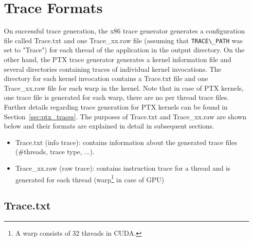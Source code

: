 \section{Trace Formats}
\label{sec:traceformat}

 On successful trace
      generation, the x86 trace generator generates a configuration file called
      Trace.txt and one Trace\_xx.raw file (assuming that \Verb+TRACE\_PATH+
          was set to "Trace") for each thread of the application in the output
      directory. On the other hand, the PTX trace generator generates a kernel
      information file and several directories containing traces of individual
      kernel invocations. The directory for each kernel invocation contains a
      Trace.txt file and one Trace\_xx.raw file for each warp in the kernel.
      Note that in case of PTX kernels, one trace file is generated for each
      warp, there are no per thread trace files. Further details regarding
      trace generation for PTX kernels can be found in
      Section~\ref{sec:ptx_traces}. The purposes of Trace.txt and Trace\_xx.raw
      are shown below and their formats are explained in detail in subsequent
      sections.


\begin{itemize}\itemsep2pt
\item Trace.txt (info trace): contains information about the generated trace files (\#threads, trace type, ...).
\item Trace\_xx.raw (raw trace): contains instruction trace for a thread and is generated for each thread (warp\footnote{A warp consists of 32 threads in CUDA.} in case of GPU)
\end{itemize}



\subsection{Trace.txt}


